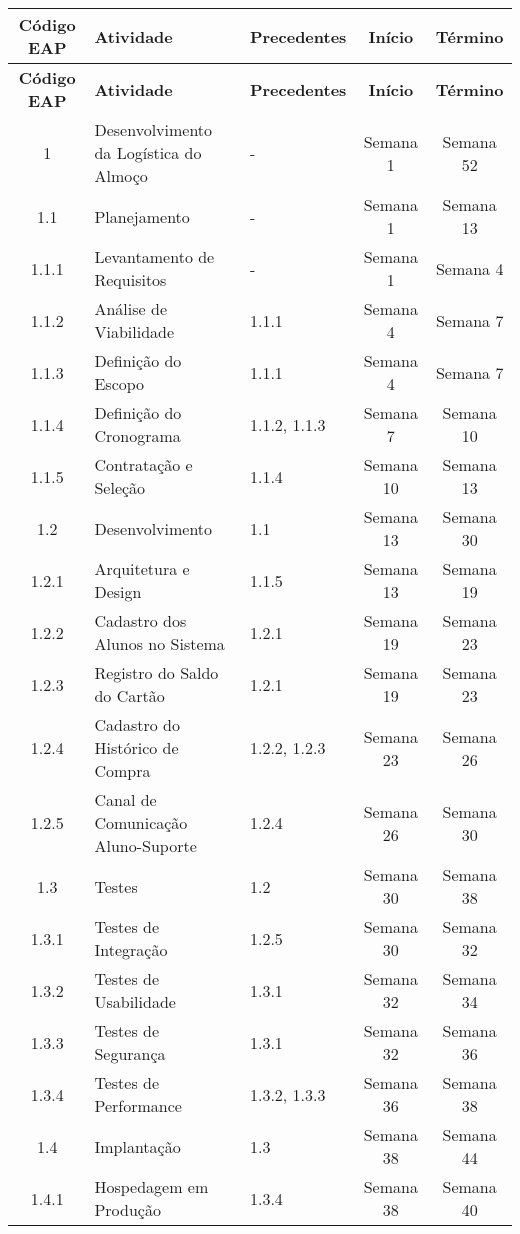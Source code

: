 \documentclass{article}
\begin{document}
\begin{longtable}{|c|l|l|c|c|}
\hline
\textbf{Código EAP} & \textbf{Atividade} & \textbf{Precedentes} & \textbf{Início} & \textbf{Término} \\
\hline
\endfirsthead
\hline
\textbf{Código EAP} & \textbf{Atividade} & \textbf{Precedentes} & \textbf{Início} & \textbf{Término} \\
\hline
\endhead
1 & Desenvolvimento da Logística do Almoço & - & Semana 1 & Semana 52 \\
\hline
1.1 & Planejamento & - & Semana 1 & Semana 13 \\
\hline
1.1.1 & Levantamento de Requisitos & - & Semana 1 & Semana 4 \\
\hline
1.1.2 & Análise de Viabilidade & 1.1.1 & Semana 4 & Semana 7 \\
\hline
1.1.3 & Definição do Escopo & 1.1.1 & Semana 4 & Semana 7 \\
\hline
1.1.4 & Definição do Cronograma & 1.1.2, 1.1.3 & Semana 7 & Semana 10 \\
\hline
1.1.5 & Contratação e Seleção & 1.1.4 & Semana 10 & Semana 13 \\
\hline
1.2 & Desenvolvimento & 1.1 & Semana 13 & Semana 30 \\
\hline
1.2.1 & Arquitetura e Design & 1.1.5 & Semana 13 & Semana 19 \\
\hline
1.2.2 & Cadastro dos Alunos no Sistema & 1.2.1 & Semana 19 & Semana 23 \\
\hline
1.2.3 & Registro do Saldo do Cartão & 1.2.1 & Semana 19 & Semana 23 \\
\hline
1.2.4 & Cadastro do Histórico de Compra & 1.2.2, 1.2.3 & Semana 23 & Semana 26 \\
\hline
1.2.5 & Canal de Comunicação Aluno-Suporte & 1.2.4 & Semana 26 & Semana 30 \\
\hline
1.3 & Testes & 1.2 & Semana 30 & Semana 38 \\
\hline
1.3.1 & Testes de Integração & 1.2.5 & Semana 30 & Semana 32 \\
\hline
1.3.2 & Testes de Usabilidade & 1.3.1 & Semana 32 & Semana 34 \\
\hline
1.3.3 & Testes de Segurança & 1.3.1 & Semana 32 & Semana 36 \\
\hline
1.3.4 & Testes de Performance & 1.3.2, 1.3.3 & Semana 36 & Semana 38 \\
\hline
1.4 & Implantação & 1.3 & Semana 38 & Semana 44 \\
\hline
1.4.1 & Hospedagem em Produção & 1.3.4 & Semana 38 & Semana 40 \\

\end{longtable}
\end{document}
